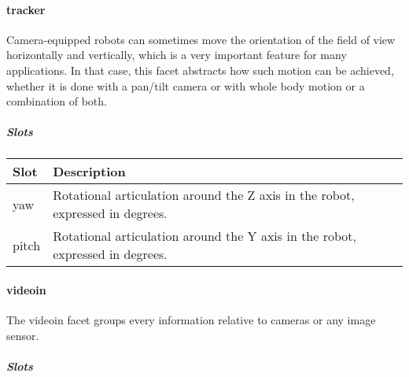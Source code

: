 \documentclass[a4paper]{article}
\begin{document}
\paragraph{tracker}


Camera-equipped robots can sometimes move the orientation of the field
of view horizontally and vertically, which is a very important feature
for many applications. In that case, this facet abstracts how such
motion can be achieved, whether it is done with a pan/tilt camera or
with whole body motion or a combination of both.

\subparagraph{Slots}

\begin{flushleft}
\tablehead{}
\begin{supertabular}{|m{3.293cm}|m{11.997cm}|}
\hline
\sffamily\bfseries Slot &
\sffamily\bfseries Description\\\hline
yaw &
\sffamily Rotational articulation around the Z
axis in the robot, expressed in degrees.\\\hline
pitch &
\sffamily Rotational articulation around the Y
axis in the robot, expressed in degrees.\\\hline
\end{supertabular}
\end{flushleft}
\paragraph{videoin}


The videoin facet groups every information relative to cameras or any
image sensor.

\subparagraph{Slots}
\end{document}
